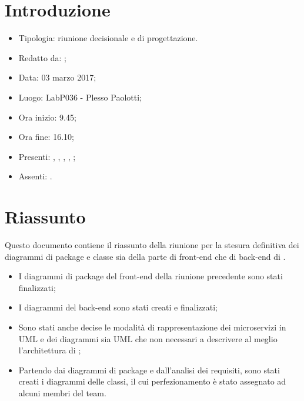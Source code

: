 \section{Introduzione}

	\begin{itemize}
		\item Tipologia: riunione decisionale e di progettazione.
		\item Redatto da: \MC;
		\item Data: 03 marzo 2017;
		\item Luogo: LabP036 - Plesso Paolotti;
		\item Ora inizio: 9.45;
		\item Ora fine: 16.10;
		\item Presenti: \AN, \AS, \DS, \MC, \NS;
		\item Assenti: \DAN.	
	\end{itemize}

\section{Riassunto}
Questo documento contiene il riassunto della riunione per la stesura definitiva dei diagrammi di package e classe sia della parte di front-end che di back-end di \progetto. 
\begin{itemize}
	\item I diagrammi di package del front-end della riunione precedente sono stati finalizzati;
	\item I diagrammi del back-end sono stati creati e finalizzati;
	\item Sono stati anche decise le modalità di rappresentazione dei microservizi in UML e dei diagrammi sia UML che non necessari a descrivere al meglio l'architettura di \progetto;
	\item Partendo dai diagrammi di package e dall'analisi dei requisiti, sono stati creati i diagrammi delle classi, il cui perfezionamento è stato assegnato ad alcuni membri del team.
	
\end{itemize}

